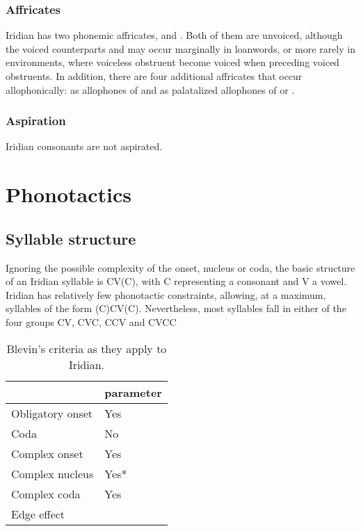 \subsubsection{Affricates}
\par Iridian has two phonemic affricates,  and . Both of them are unvoiced, although the voiced counterparts  and  may occur marginally in loanwords, or more rarely in  environments, where voiceless obstruent become voiced when preceding voiced obstruents. In addition, there are four additional affricates that occur allophonically:  as allophones of  and  as palatalized allophones of  or .
\par 
\subsubsection{Aspiration}
\par Iridian consonants are not aspirated.

\section{Phonotactics}

\subsection{Syllable structure}

Ignoring the possible complexity of the onset, nucleus or coda, the basic structure of an Iridian syllable is CV(C), with C representing a consonant and V a vowel. Iridian has relatively few phonotactic constraints, allowing, at a maximum, syllables of the form (C)CV(C). Nevertheless, most syllables fall in either of the four groups CV, CVC, CCV and CVCC

\begin{table}[h!]
	\centering
	\caption{Blevin's criteria as they apply to Iridian.}
	\begin{tabularx}{0.6\textwidth}{YM}
		\toprule
		& {\sc parameter}\\
		\midrule
		Obligatory onset & Yes\\
		Coda & No\\
		Complex onset & Yes\\
		Complex nucleus & Yes*\\
		Complex coda & Yes\\
		Edge effect & \\
		\bottomrule
	\end{tabularx}
\end{table}


